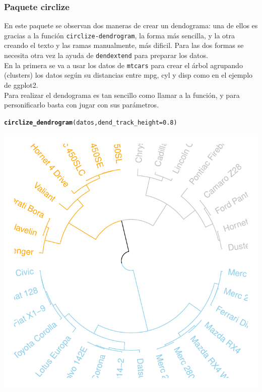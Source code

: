 \documentclass{article}\usepackage[]{graphicx}\usepackage[]{color}
\makeatletter
\def\maxwidth{ %
  \ifdim\Gin@nat@width>\linewidth
    \linewidth
  \else
    \Gin@nat@width
  \fi
}
\newcommand{\hlnum}[1]{\textcolor[rgb]{0.686,0.059,0.569}{#1}}%
\newcommand{\hlstd}[1]{\textcolor[rgb]{0.345,0.345,0.345}{#1}}%
\newcommand{\hlkwc}[1]{\textcolor[rgb]{0.333,0.667,0.333}{#1}}%
\newcommand{\hlkwd}[1]{\textcolor[rgb]{0.737,0.353,0.396}{\textbf{#1}}}%
\newenvironment{kframe}{%
 \def\at@end@of@kframe{}%
 \ifinner\ifhmode%
  \def\at@end@of@kframe{\end{minipage}}%
  \begin{minipage}{\columnwidth}%
 \fi\fi%
 \def\FrameCommand##1{\hskip\@totalleftmargin \hskip-\fboxsep
 \colorbox{shadecolor}{##1}\hskip-\fboxsep
     \hskip-\linewidth \hskip-\@totalleftmargin \hskip\columnwidth}%
 \MakeFramed {\advance\hsize-\width
   \@totalleftmargin\z@ \linewidth\hsize
   \@setminipage}}%
 {\par\unskip\endMakeFramed%
 \at@end@of@kframe}
\newenvironment{knitrout}{}{} %
\makeatother
\begin{document}
\subsubsection{Paquete circlize}
En este paquete\cite{docu_circlize} se observan dos maneras de crear un dendograma: una de ellos es gracias a la funci\'on \texttt{circlize-dendrogram}, la forma m\'as sencilla, y la otra creando el texto y las ramas manualmente, m\'as dificil.
Para las dos formas se necesita otra vez la ayuda de \texttt{dendextend} para preparar los datos.~\\ En la primera se va a usar los datos de \texttt{mtcars} para crear el \'arbol agrupando (clusters) los datos seg\'un su distancias entre mpg, cyl y disp como en el ejemplo de ggplot2.~\\
Para realizar el dendograma es tan sencillo como llamar a la funci\'on, y para personificarlo basta con jugar con sus par\'ametros.
\begin{knitrout}
\color{fgcolor}\begin{kframe}
\begin{alltt}
\hlkwd{circlize_dendrogram}\hlstd{(datos,} \hlkwc{dend_track_height} \hlstd{=} \hlnum{0.8}\hlstd{)}
\end{alltt}
\end{kframe}

{\centering \includegraphics[width=\maxwidth]{figure/plot_circlize_dendo_1-1} 

}



\end{knitrout}
\end{document}
